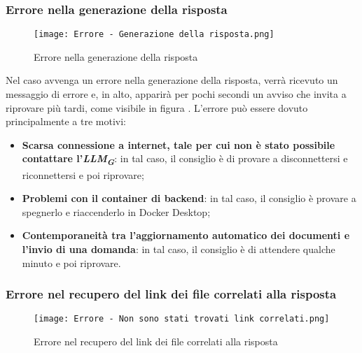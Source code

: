 \subsubsection{Errore nella generazione della risposta}

\begin{figure}[h]
    \centering
        \texttt{[image: Errore - Generazione della risposta.png]}
        \caption{Errore nella generazione della risposta}
        \label{fig:Errore nella generazione della risposta}
\end{figure}

Nel caso avvenga un errore nella generazione della risposta, verrà ricevuto un messaggio di errore e, in alto, apparirà per pochi secondi un avviso che invita a riprovare più tardi, come visibile in figura . L'errore può essere dovuto principalmente a tre motivi:
\begin{itemize}
    \item \textbf{Scarsa connessione a internet, tale per cui non è stato possibile contattare l'\emph{LLM}\textsubscript{\textbf{\textit{G}}}}: in tal caso, il consiglio è di provare a disconnettersi e riconnettersi e poi riprovare;
    \item \textbf{Problemi con il container di backend}: in tal caso, il consiglio è provare a spegnerlo e riaccenderlo in Docker Desktop;
    \item \textbf{Contemporaneità tra l'aggiornamento automatico dei documenti e l'invio di una domanda}: in tal caso, il consiglio è di attendere qualche minuto e poi riprovare.
\end{itemize}



\subsubsection{Errore nel recupero del link dei file correlati alla risposta}

\begin{figure}[h]
    \centering
        \texttt{[image: Errore - Non sono stati trovati link correlati.png]}
        \caption{Errore nel recupero del link dei file correlati alla risposta}
        \label{fig:Errore nel recupero del link dei file correlati alla risposta}
\end{figure}

